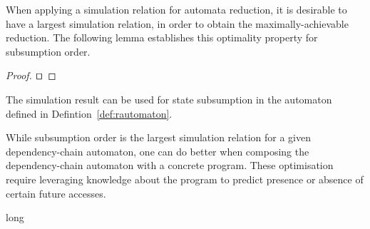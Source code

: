 \documentclass[envcountsame]{llncs}%
\def\longversion{long}
\begin{document}
%
When applying a simulation relation for automata reduction,
it is desirable to have a largest simulation relation,
in order to obtain the maximally-achievable reduction.
%
The following lemma establishes this optimality property for subsumption order.
%
\begin{theorem}

\end{theorem}
%
\begin{proof}


$\qed$
\end{proof}
%

The simulation result can be used for state subsumption in 
the automaton defined in Defintion~\ref{def:rautomaton}.


While subsumption order is the largest simulation relation for
a given dependency-chain automaton, 
one can do better when composing the dependency-chain automaton
with a concrete program. 
These optimisation require leveraging knowledge about the program
to predict presence or absence of certain future accesses.




\ifx\versiont\longversion

\fi
\end{document}
